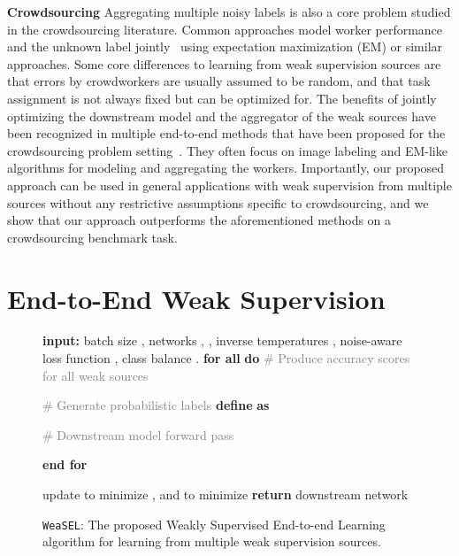 \documentclass{article}
\newcommand{\weasel}{\texttt{WeaSEL}}\newcommand{\brackets}[1]{\left( #1 \right)}
\begin{document}
\textbf{Crowdsourcing} 
Aggregating multiple noisy labels is also a core problem studied in the crowdsourcing literature. Common approaches model worker performance and the unknown label jointly~\cite{SkeneModel,Crowdsourcing3,Crowdsourcing2} using expectation maximization (EM) or similar approaches. Some core differences to learning from weak supervision sources are that errors by crowdworkers  are usually assumed to be random, and that task assignment is not always fixed but can be optimized for. 
The benefits of jointly optimizing the downstream model and the aggregator of the weak sources have been recognized in multiple end-to-end methods that have been proposed for the crowdsourcing problem setting~\cite{raykar10a, doctorNet, Crowdsourcing4, khetan2017learning, rodrigues2018deep, MaxMIG}. They often focus on image labeling and EM-like algorithms for modeling and aggregating the workers.
Importantly, our proposed approach can be used in general applications with weak supervision from multiple sources without any restrictive assumptions specific to crowdsourcing, and we show that our approach outperforms the aforementioned methods on a crowdsourcing benchmark task.




 
\section{End-to-End Weak Supervision}
\label{Methods}
\begin{wrapfigure}{rh}{0.6\textwidth}
\vspace{-0.8cm}
    \begin{minipage}{0.6\textwidth}
        \begin{algorithm}[H] \caption{\label{alg:main} \weasel: The proposed Weakly Supervised End-to-end Learning algorithm for learning from multiple weak supervision sources.}
\begin{algorithmic}
    \STATE \textbf{input:}
    batch size , networks , , inverse temperatures , noise-aware loss function , class balance .
    \STATE \textbf{for all}  \textbf{do}
        \STATE 
        \textcolor{gray}{\# Produce accuracy scores for all weak sources}
        \STATE 
        
        \STATE 
        \textcolor{gray}{\# Generate probabilistic labels}
        \STATE 
        \textbf{define}  \textbf{as}~ 
        
        \STATE 
        
        \STATE 
        \textcolor{gray}{\# Downstream model forward pass}
        \STATE 
         
    \STATE \textbf{end for}
    \STATE 
    
    
    \STATE
    
\STATE update  to minimize , and  to minimize 
    \ENDFOR
    \STATE \textbf{return} downstream network 
\end{algorithmic}
        \end{algorithm}
    \end{minipage}
\vspace{-1.cm}
\end{wrapfigure}
 
\end{document}
